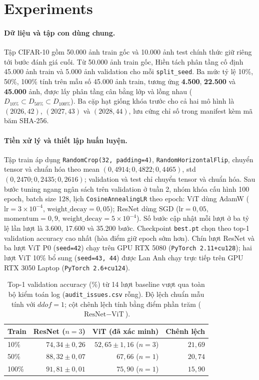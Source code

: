 \documentclass[11pt,a4paper]{article}
\begin{document}


\section{Experiments}
\paragraph{Dữ liệu và tập con dùng chung.}
Tập CIFAR-10 \citep{krizhevsky2009learning} gồm 50.000 ảnh train gốc và 10.000 ảnh test chính thức giữ riêng tới bước đánh giá cuối. Từ 50.000 ảnh train gốc, Hiền tách phân tầng cố định 45.000 ảnh train và 5.000 ảnh validation cho mỗi \texttt{split\_seed}. Ba mức tỷ lệ 10\%, 50\%, 100\% tính trên mẫu số 45.000 ảnh train, tương ứng \textbf{4.500}, \textbf{22.500} và \textbf{45.000} ảnh, được lấy phân tầng cân bằng lớp và lồng nhau ($D_{10\%}\subset D_{50\%}\subset D_{100\%}$). Ba cặp hạt giống khóa trước cho cả hai mô hình là $(2026,42)$, $(2027,43)$ và $(2028,44)$, lưu cứng chỉ số trong manifest kèm mã băm SHA-256.

\paragraph{Tiền xử lý và thiết lập huấn luyện.}
Tập train áp dụng \texttt{RandomCrop(32, padding=4)}, \texttt{RandomHorizontalFlip}, chuyển tensor và chuẩn hóa theo mean $(0{,}4914; 0{,}4822; 0{,}4465)$, std $(0{,}2470; 0{,}2435; 0{,}2616)$; validation và test chỉ chuyển tensor và chuẩn hóa. Sau bước tuning ngang ngân sách trên validation ở tuần 2, nhóm khóa cấu hình 100 epoch, batch size 128, lịch \texttt{CosineAnnealingLR} theo epoch: ViT dùng AdamW ($\text{lr}=3\times10^{-4}$, $\text{weight\_decay}=0{,}05$); ResNet dùng SGD ($\text{lr}=0{,}05$, $\text{momentum}=0{,}9$, $\text{weight\_decay}=5\times10^{-4}$). Số bước cập nhật mỗi lượt ở ba tỷ lệ lần lượt là 3.600, 17.600 và 35.200 bước. Checkpoint \texttt{best.pt} chọn theo top-1 validation accuracy cao nhất (hòa điểm giữ epoch sớm hơn). Chín lượt ResNet và ba lượt ViT P0 (\texttt{seed=42}) chạy trên GPU RTX 5080 (\texttt{PyTorch 2.11+cu128}); hai lượt ViT 10\% bổ sung (\texttt{seed=43, 44}) được Lan Anh chạy trực tiếp trên GPU RTX 3050 Laptop (\texttt{PyTorch 2.6+cu124}).

\begin{table}[t]
\centering
\small
\begin{tabular}{lrrr}
\toprule
Train & ResNet ($n=3$) & ViT (đã xác minh) & Chênh lệch\\
\midrule
10\% & $74{,}34\pm0{,}26$ & $52{,}65\pm1{,}16$ ($n=3$) & $21{,}69$\\
50\% & $88{,}32\pm0{,}07$ & $67{,}66$ ($n=1$) & $20{,}74$\\
100\% & $91{,}81\pm0{,}01$ & $75{,}90$ ($n=1$) & $15{,}90$\\
\bottomrule
\end{tabular}
\caption{Top-1 validation accuracy (\%) từ 14 lượt baseline vượt qua toàn bộ kiểm toán log (\texttt{audit\_issues.csv} rỗng). Độ lệch chuẩn mẫu tính với $ddof=1$; cột chênh lệch tính bằng điểm phần trăm ($\text{ResNet}-\text{ViT}$).}
\label{tab:val_results}
\end{table}
\end{document}
